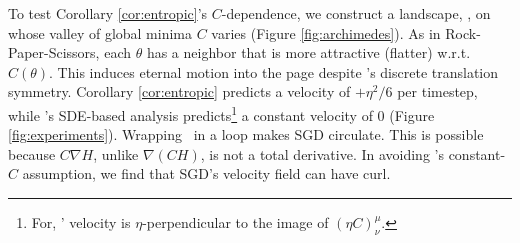 To test Corollary \ref{cor:entropic}'s $C$-dependence,
we %
construct a landscape, \Helix, on
whose valley of global minima $C$ varies (Figure
\ref{fig:archimedes}).  As in Rock-Paper-Scissors, each 
$\theta$ has a neighbor that is more attractive (flatter) w.r.t.\
$C(\theta)$.  This induces eternal motion into the page
despite \Helix's discrete translation symmetry.
Corollary \ref{cor:entropic} predicts a velocity of
$+\eta^2/6$ per timestep, while \cite{ch18}'s SDE-based analysis
predicts\footnote{
    For, \Helix' velocity is $\eta$-perpendicular to the image
    of $(\eta C)^\mu_\nu$.%
} a constant velocity of $0$ (Figure
\ref{fig:experiments}).
Wrapping \Helix\ in a loop makes SGD circulate. %
This is
possible because $C\nabla H$, unlike $\nabla(CH)$, is not a total
derivative. 
In avoiding \cite{we19b}'s constant-$C$ assumption, we 
find that SGD's velocity field can have curl. 

